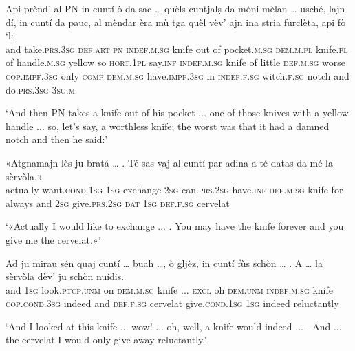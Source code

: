 \begin{linenumbers}
	\gll  Api prènd’ al \textsc{PN} in cuntí ò da sac … quèls cuntjalṣ da mòni mèlan … usché, lajn dí, in cuntí da pauc, al mèndar èra mù tga quèl vèv’ ajn ina stria furclèta, api fò ‘l: \\
	and take.\textsc{prs.3sg} \textsc{def.art} \textsc{pn} \textsc{indef.m.sg} knife out of pocket.\textsc{m.sg} {} \textsc{dem.m.pl} knife.\textsc{pl} of handle.\textsc{m.sg} yellow {} so \textsc{hort.1pl} say.\textsc{inf} \textsc{indef.m.sg} knife of little \textsc{def.m.sg} worse \textsc{cop.impf.3sg} only  \textsc{comp} \textsc{dem.m.sg} have.\textsc{impf.3sg} in \textsc{indef.f.sg} witch.\textsc{f.sg} notch and do.\textsc{prs.3sg} \textsc{3sg.m}\\
\end{linenumbers}
\medskip
\glt `And then \textsc{PN} takes a knife out of his pocket ... one of those knives with a yellow handle ... so, let's say, a worthless knife; the worst was that it had a damned notch and then he said:'
\medskip

\begin{linenumbers}
	\gll  «Atgnamajn lès ju bratá … . Té sas vaj al cuntí par adina a té datas da mé la sèrvòla.»  \\
	actually want.\textsc{cond.1sg} \textsc{1sg} exchange {} {} \textsc{2sg} can.\textsc{prs.2sg} have.\textsc{inf} \textsc{def.m.sg} knife for always and \textsc{2sg} give.\textsc{prs.2sg} \textsc{dat} \textsc{1sg} \textsc{def.f.sg} cervelat\\
\end{linenumbers}
\medskip
\glt `«Actually I would like to exchange ... . You may have the knife forever and you give me the cervelat.»'
\medskip

\begin{linenumbers}
	\gll Ad ju mirau sén quaj cuntí … buah …, ò gljèz, in cuntí fùs schòn … . A … la sèrvòla dèv’ ju schòn nuídis.    \\
	and \textsc{1sg} look.\textsc{ptcp.unm} on \textsc{dem.m.sg} knife ... \textsc{excl} {} oh \textsc{dem.unm} \textsc{indef.m.sg} knife \textsc{cop.cond.3sg} indeed {} {} and {} \textsc{def.f.sg} cervelat give.\textsc{cond.1sg} \textsc{1sg} indeed reluctantly\\
\end{linenumbers}
\medskip
\glt `And I looked at this knife ... wow! ... oh, well, a knife would indeed ... . And ... the cervelat I would only give away reluctantly.'
\medskip

